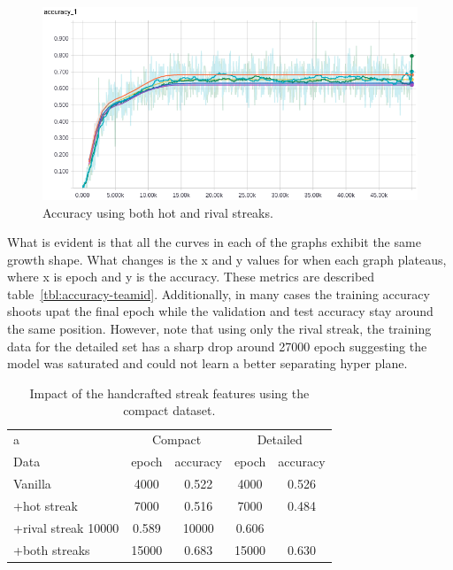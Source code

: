 \documentclass{article} %
\begin{document}
\begin{figure}[!htb]
\endminipage
{}%
  \includegraphics[width=\linewidth]{plots/model1/wteam_onehot/streak-hr/accuracy.png}
  \caption{Accuracy using both hot and rival streaks.}\label{fig:wteam-onehot-hr-accuracy}
\endminipage
\end{figure}

What is evident is that all the curves in each of the graphs exhibit the same growth shape.  What changes is the x and y values for when each graph plateaus, where x is epoch and y is the accuracy.  These metrics are described table~\ref{tbl:accuracy-teamid}.  Additionally, in many cases the training accuracy shoots upat the final epoch while the validation and test accuracy stay around the same position.  However, note that using only the rival streak, the training data for the detailed set has a sharp drop around 27000 epoch suggesting the model was saturated and could not learn a better separating hyper plane.

\begin{table}
\centering
  \begin{tabular}{|l|c|c|c|c|}
  \hline
  a & \multicolumn{2}{|c|}{Compact} & \multicolumn{2}{|c|}{Detailed}\\
  Data & epoch & accuracy & epoch & accuracy\\
  \hline
  Vanilla & 4000 & 0.522 & 4000 & 0.526\\ 
  +hot streak & 7000 & 0.516 & 7000 & 0.484\\
  +rival streak 10000 & 0.589 & 10000 & 0.606\\
  +both streaks & 15000 & 0.683 & 15000 & 0.630\\
  \end{tabular}
  \caption{Impact of the handcrafted streak features using the compact dataset.}
\end{table}
\label{tbl:accuracy-wteamid}
\end{document}
